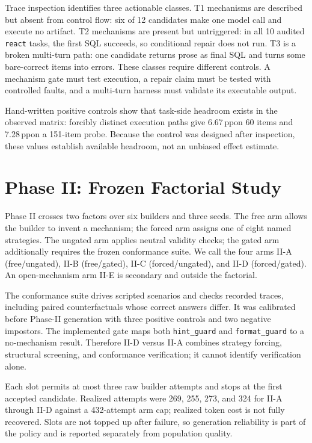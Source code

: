 \documentclass{article}
\newcommand{\react}{\texttt{react}}
\newcommand{\pp}{\,pp}
\begin{document}
Trace inspection identifies three actionable classes. T1 mechanisms are
described but absent from control flow: six of 12 candidates make one model
call and execute no artifact. T2 mechanisms are present but untriggered: in
all 10 audited \react{} tasks, the first SQL succeeds, so conditional repair
does not run. T3 is a broken multi-turn path: one candidate returns prose as
final SQL and turns some bare-correct items into errors. These classes require
different controls. A mechanism gate must test execution, a repair claim must
be tested with controlled faults, and a multi-turn harness must validate its
executable output.

Hand-written positive controls show that task-side headroom exists in the
observed matrix: forcibly distinct execution paths give 6.67\pp on 60 items
and 7.28\pp on a 151-item probe. Because the control was designed after
inspection, these values establish available headroom, not an unbiased effect
estimate.

\section{Phase II: Frozen Factorial Study}

Phase II crosses two factors over six builders and three seeds. The free arm
allows the builder to invent a mechanism; the forced arm assigns one of eight
named strategies. The ungated arm applies neutral validity checks; the gated
arm additionally requires the frozen conformance suite. We call the four arms
II-A (free/ungated), II-B (free/gated), II-C (forced/ungated), and II-D
(forced/gated). An open-mechanism arm II-E is secondary and outside the
factorial.

The conformance suite drives scripted scenarios and checks recorded traces,
including paired counterfactuals whose correct answers differ. It was calibrated
before Phase-II generation with three positive controls and two negative
impostors. The implemented gate maps both \texttt{hint\_guard} and
\texttt{format\_guard} to a no-mechanism result. Therefore II-D versus II-A
combines strategy forcing, structural screening, and conformance verification;
it cannot identify verification alone.

Each slot permits at most three raw builder attempts and stops at the first
accepted candidate. Realized attempts were 269, 255, 273, and 324 for II-A
through II-D against a 432-attempt arm cap; realized token cost is not fully
recovered. Slots are not topped up after failure, so generation reliability is
part of the policy and is reported separately from population quality.
\end{document}

